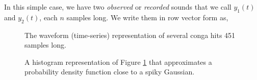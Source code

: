 In this simple case, we have two {\it observed} or {\it recorded} 
sounds that we call $y_{1}(t)$ and $y_{2}(t)$, each $n$ samples long. 
We write them in row vector form as, 

\begin{figure}[thp]
  \begin{center}
    \caption{The waveform (time-series) representation of several
      conga hits 451 samples long.} 
    \label{PDFHistoWaveform}
  \end{center}
\end{figure}

\begin{figure}[thp]
  \begin{center}
    \caption{A histogram representation of Figure
      \ref{PDFHistoWaveform} that approximates a probability density
      function close to a spiky Gaussian.}
    \label{PDFHisto}
  \end{center}
\end{figure}

